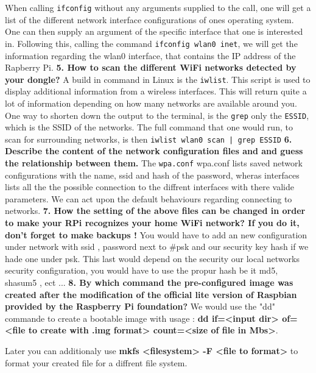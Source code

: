 \documentclass[a4paper,oneside,onecolumn]{article}
\newcommand{\code}[1]{\colorbox{codegray}{\texttt{#1}}}
\begin{document}
\newline
\newline
When calling \code{ifconfig} without any arguments supplied to the call, one will get a list of the different network interface configurations of ones operating system. One can then supply an argument of the specific interface that one is interested in. Following this, calling the command \code{ifconfig wlan0 inet}, we will get the information regarding the wlan0 interface, that contains the IP address of the Rapberry Pi.
\newline
\newline
\noindent
\textbf{5. How to scan the different WiFi networks detected by your dongle?}
\newline
\newline
A build in command in Linux is the \code{iwlist}. This script is used to display additional information from a wireless interfaces. This will return quite a lot of information depending on how many networks are available around you. One way to shorten down the output to the terminal, is the \texttt{grep} only the \texttt{ESSID}, which is the SSID of the networks. The full command that one would run, to scan for surrounding networks, is then \code{iwlist wlan0 scan | grep ESSID}
\newline
\newline
\noindent
\textbf{6. Describe the content of the network configuration files  and 
and guess the relationship between them.}
\newline
\newline
The \texttt{wpa.conf}
wpa.conf lists saved network configurations with the name, ssid and hash of the password, wheras interfaces lists all the the possible connection to the diffrent interfaces with there valide parameters. We can act upon the default behaviours regarding connecting to networks.
\newline
\newline
\noindent
\textbf{7. How the setting of the above files can be changed in order to make your RPi recognizes your home
WiFi network? If you do it, don’t forget to make backups !}
\newline
\newline
You would have to add an new configuration under network with ssid , password next to \#psk and our security key hash if we hade one under psk. This last would depend on the security our local networks security configuration, you would have to use the propur hash be it md5, shasum5 , ect ...
\newline
\newline
\noindent
\textbf{8. By which command the pre-configured image was created after the modification of the official lite
version of Raspbian provided by the Raspberry Pi foundation?}
\newline
\newline
We would use the "dd" commande to create a bootable image with usage :
\textbf{dd if=<input dir> of=<file to create with .img format> count=<size of file in Mbs>}.

Later you can additionaly use \textbf{mkfs <filesystem> -F <file to format>} to format your created file for a diffrent file system.
\end{document}

